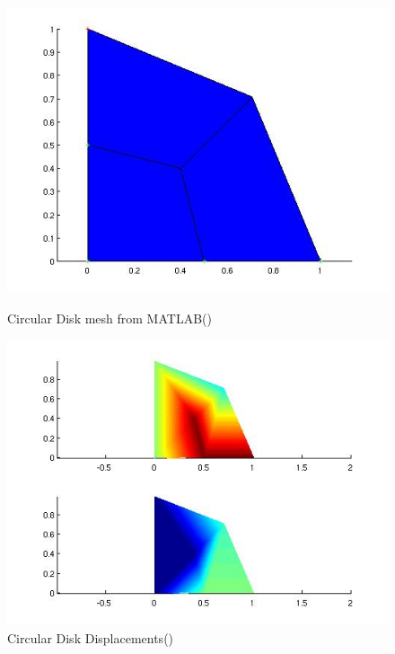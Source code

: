 \begin{figure}[htbp]
  \begin{minipage}{0.45\linewidth}
    \includegraphics[width=\linewidth]{fig/circular_disk11_mesh_matlab.jpg}
    \caption{Circular Disk mesh from MATLAB()}
    \label{fig:CircularDisk11MeshMATLAB}
  \end{minipage}
  \hfill
  \begin{minipage}{0.45\linewidth}
    \includegraphics[width=\linewidth]{fig/circular_disk11_disp_matlab.jpg}
    \caption{Circular Disk Displacements()}
    \label{fig:CircularDisk11Displacements}
  \end{minipage}
  \begin{minipage}{0.45\linewidth}

\end{minipage}
\end{figure}
